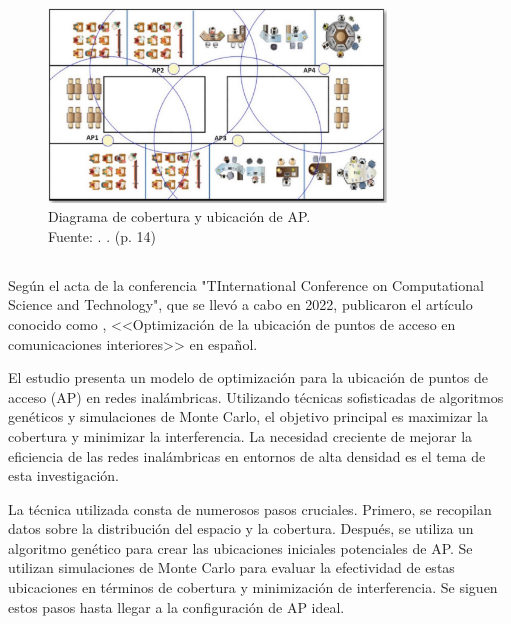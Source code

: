 \begin{figure}[!ht]
	\begin{center}
		\includegraphics[width=0.80\textwidth]{2/figures/contreras2021.png}
		\caption[Diagrama de cobertura y ubicación de AP]{Diagrama de cobertura y ubicación de AP.\\
			Fuente: \cite{pr_contreras2021modelwlan}. . (p. 14)}
		\label{2:fig111}
	\end{center}
\end{figure}

\subsection{}
Según el acta de la conferencia "TInternational Conference on Computational Science and Technology", que se llevó a cabo en 2022, \cite{pr_alathari2023optaps} publicaron el artículo conocido como , <<Optimización de la ubicación de puntos de acceso en comunicaciones interiores>> en español.

El estudio presenta un modelo de optimización para la ubicación de puntos de acceso (AP) en redes inalámbricas. Utilizando técnicas sofisticadas de algoritmos genéticos y simulaciones de Monte Carlo, el objetivo principal es maximizar la cobertura y minimizar la interferencia. La necesidad creciente de mejorar la eficiencia de las redes inalámbricas en entornos de alta densidad es el tema de esta investigación.

La técnica utilizada consta de numerosos pasos cruciales. Primero, se recopilan datos sobre la distribución del espacio y la cobertura. Después, se utiliza un algoritmo genético para crear las ubicaciones iniciales potenciales de AP. Se utilizan simulaciones de Monte Carlo para evaluar la efectividad de estas ubicaciones en términos de cobertura y minimización de interferencia. Se siguen estos pasos hasta llegar a la configuración de AP ideal.

